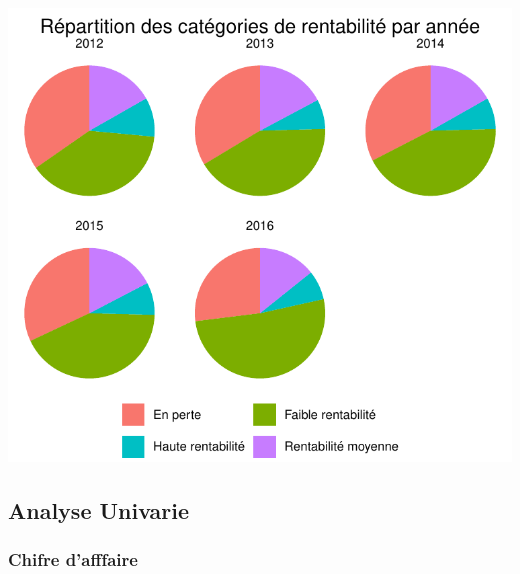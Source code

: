 \documentclass[mstat,12pt]{unswthesis}
\begin{document}
\medskip

\includegraphics{scdon2-UPV-report-template_sansPython_files/figure-latex/rentabilite-1.pdf}

\newpage

\subsection{Analyse Univarie}\label{analyse-univarie}

\medskip

\subsubsection{Chifre d'afffaire}\label{chifre-dafffaire}
\end{document}
